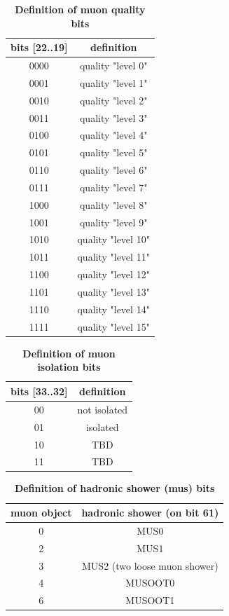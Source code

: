 \documentclass{cmspaper}
\begin{document}
\begin{table}[ht]
\caption{\bf Definition of muon quality bits}
\vspace{5mm}
\centering
\begin{tabular}{|c|c|}\hline
bits [22..19] & definition \\\hline\hline
0000 & quality "level 0" \\
0001 & quality "level 1" \\
0010 & quality "level 2" \\
0011 & quality "level 3" \\
0100 & quality "level 4" \\
0101 & quality "level 5" \\
0110 & quality "level 6" \\
0111 & quality "level 7" \\
1000 & quality "level 8" \\
1001 & quality "level 9" \\
1010 & quality "level 10" \\
1011 & quality "level 11" \\
1100 & quality "level 12" \\
1101 & quality "level 13" \\
1110 & quality "level 14" \\
1111 & quality "level 15" \\\hline
\end{tabular}
\label{table:muon_quality_bits}
\end{table}

\begin{table}[ht]
\caption{\bf Definition of muon isolation bits}
\vspace{5mm}
\centering
\begin{tabular}{|c|c|}\hline
bits [33..32] & definition \\\hline\hline
00 & not isolated \\
01 & isolated \\
10 & TBD \\
11 & TBD \\\hline
\end{tabular}
\label{table:muon_iso_bits}
\end{table}

\begin{table}[ht]
\caption{\bf Definition of hadronic shower (mus) bits}
\vspace{5mm}
\centering
\begin{tabular}{|c|c|}\hline
muon object & hadronic shower (on bit 61)\\\hline\hline
0 & MUS0 \\
2 & MUS1 \\
3 & MUS2 (two loose muon shower)\\
4 & MUSOOT0 \\
6 & MUSOOT1 \\\hline
\end{tabular}
\label{table:muon_shower_bits}
\end{table}
\end{document}
